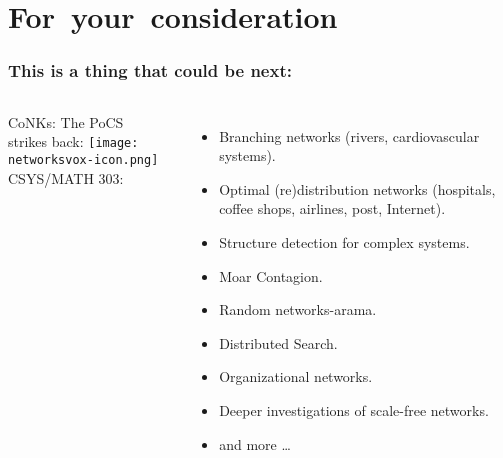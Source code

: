 \section{For\ your\ consideration}

\begin{frame}
  \small
  \frametitle{This is a thing that could be next:}

  \begin{block}{}
    \begin{columns}
      CoNKs: The PoCS\\ strikes back:
      \smallskip
      \texttt{[image: networksvox-icon.png]}\\
      \smallskip
      CSYS/MATH 303: \\
      \\
      \begin{itemize}
      \item<2-> 
        Branching networks (rivers, cardiovascular systems).
      \item<2-> 
        Optimal (re)distribution networks (hospitals, coffee shops, airlines, post, Internet).
      \item<2-> 
        Structure detection for complex systems.
      \item<2-> 
        Moar Contagion.
      \item<2-> 
        Random networks-arama.
      \item<2-> 
        Distributed Search.
      \item<2-> 
        Organizational networks.
      \item<2-> 
        Deeper investigations of scale-free networks.
      \item<3-> 
        and more \ldots
      \end{itemize}
    \end{columns}
  \end{block}

\end{frame}

